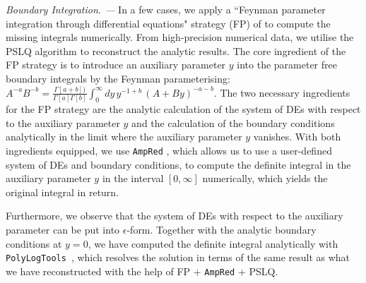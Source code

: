 \documentclass[twocolumn,superscriptaddress,amsmath, amssymb, amsfonts,preprintnumbers,aps,prd,longbibliography,nofootinbib]{revtex4-2}
\renewcommand{\sec}[1]{\textit{#1. --- }}
\begin{document}
\begin{widetext}
\sec{Boundary Integration}
In a few cases, we apply a ``Feynman parameter integration through differential equations" strategy (FP) of \cite{Hidding:2022ycg} to compute the missing integrals numerically. From high-precision numerical data, we utilise the PSLQ algorithm \cite{Ferguson1999PSLQ} to reconstruct the analytic results. The core ingredient of the FP strategy is to introduce an auxiliary parameter $y$ into the parameter free boundary integrals by the Feynman parameterising: $A^{-a}B^{-b}=\frac{\Gamma[a+b])}{\Gamma[a] \Gamma[b]} \int_0^\infty dy\,y^{-1+b} \,(A+B y)^{-a-b}$. The two necessary ingredients for the FP strategy are the analytic calculation of the system of DEs with respect to the auxiliary parameter $y$ and the calculation of the boundary conditions analytically in the limit where the auxiliary parameter $y$ vanishes. With both ingredients equipped, we use \texttt{AmpRed} \cite{Chen:2024xwt, Chen:2019mqc, Chen:2019fzm, Chen:2020wsh}, which allows us to use a user-defined system of DEs and boundary conditions, to compute the definite integral in the auxiliary parameter $y$ in the interval $[0,\infty]$ numerically, which yields the original integral in return.

Furthermore, we observe that the system of DEs with respect to the auxiliary parameter can be put into $\epsilon$-form. Together with the analytic boundary conditions at $y=0$, we have computed the definite integral analytically with \texttt{PolyLogTools}~\cite{Duhr:2019tlz}, which resolves the solution in terms of the same result as what we have reconstructed with the help of FP + \texttt{AmpRed} + PSLQ.


\end{widetext}
\end{document}
